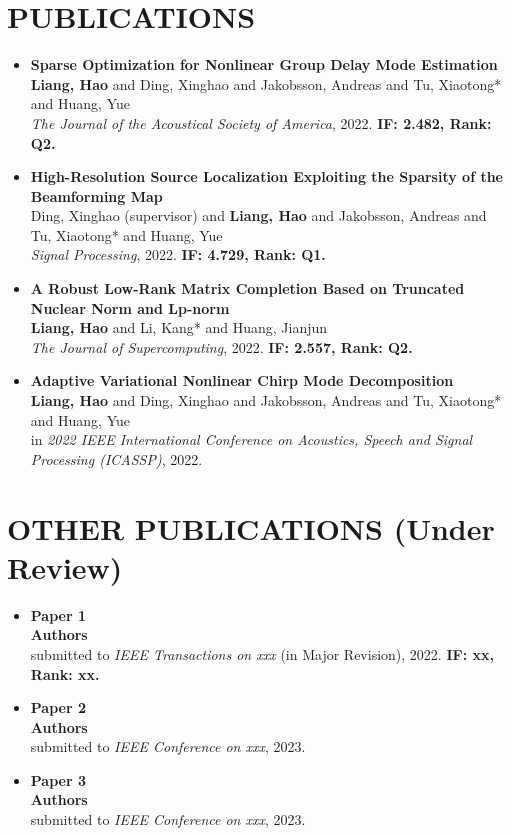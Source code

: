 \documentclass[11pt,a4paper,roman]{moderncv}        %
\begin{document}
	
	
	\section{PUBLICATIONS}
	\begin{itemize}
		\item \textbf{Sparse Optimization for Nonlinear Group Delay Mode Estimation} \\
		\textbf{Liang, Hao} and Ding, Xinghao and Jakobsson, Andreas and Tu, Xiaotong* and Huang, Yue \\
		\emph{The Journal of the Acoustical Society of America}, 2022. \textbf{IF: 2.482, Rank: Q2.} 
		\vspace{2mm}
		\item \textbf{High-Resolution Source Localization Exploiting the Sparsity of the Beamforming Map} \\
		Ding, Xinghao (supervisor) and \textbf{Liang, Hao} and Jakobsson, Andreas and Tu, Xiaotong* and Huang, Yue \\
		\emph{Signal Processing}, 2022. \textbf{IF: 4.729, Rank: Q1.} 
		\vspace{2mm}
		\item \textbf{A Robust Low-Rank Matrix Completion Based on Truncated Nuclear Norm and Lp-norm} \\
		\textbf{Liang, Hao} and Li, Kang* and Huang, Jianjun \\
		\emph{The Journal of Supercomputing}, 2022. \textbf{IF: 2.557, Rank: Q2.}
		\vspace{2mm}
		\item \textbf{Adaptive Variational Nonlinear Chirp Mode Decomposition} \\
		\textbf{Liang, Hao} and Ding, Xinghao and Jakobsson, Andreas and Tu, Xiaotong* and Huang, Yue \\
		in \emph{2022 IEEE International Conference on Acoustics, Speech and Signal Processing (ICASSP)}, 2022.
	\end{itemize}

	\section{OTHER PUBLICATIONS (Under Review)}
	
	\begin{itemize}
		\vspace{2mm}
		\item \textbf{Paper 1} \\
		\textbf{Authors} \\
		submitted to \emph{IEEE Transactions on xxx} (in Major Revision), 2022. \textbf{IF: xx, Rank: xx.}
		\vspace{2mm}
		\item \textbf{Paper 2} \\
		\textbf{Authors} \\
		submitted to \emph{IEEE Conference on xxx}, 2023. 
		\vspace{2mm}
		\item \textbf{Paper 3} \\
		\textbf{Authors} \\
		submitted to \emph{IEEE Conference on xxx}, 2023.
	\end{itemize}
	
\end{document}
